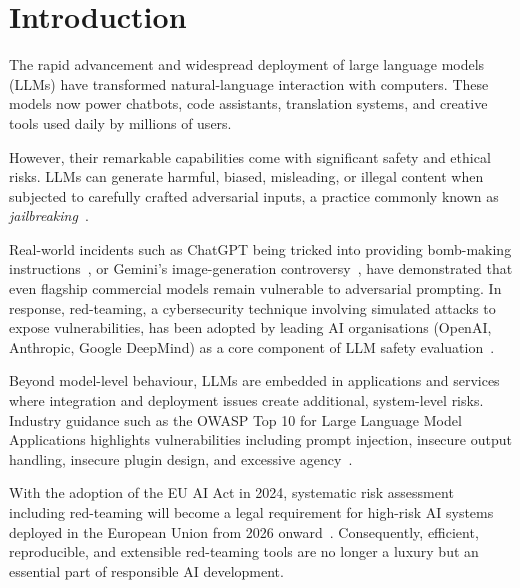 
% 

\chapter{Introduction}\label{ch:introduction}

The rapid advancement and widespread deployment of large language models (LLMs) have transformed natural-language interaction with computers.
These models now power chatbots, code assistants, translation systems, and creative tools used daily by millions of users.

However, their remarkable capabilities come with significant safety and ethical risks.
LLMs can generate harmful, biased, misleading, or illegal content when subjected to carefully crafted adversarial inputs, a practice commonly known as \emph{jailbreaking}~\cite{wei2023jailbroken, zou2023universal}.

Real-world incidents such as ChatGPT being tricked into providing bomb-making instructions~\cite{yaser2023potential}, or Gemini's image-generation controversy~\cite{shaw2025agonistic}, have demonstrated that even flagship commercial models remain vulnerable to adversarial prompting.
In response, red-teaming, a cybersecurity technique involving simulated attacks to expose vulnerabilities, has been adopted by leading AI organisations (OpenAI, Anthropic, Google DeepMind) as a core component of LLM safety evaluation~\cite{openai2023redteaming}.

Beyond model-level behaviour, LLMs are embedded in applications and services where integration and deployment issues create additional, system-level risks.
Industry guidance such as the OWASP Top 10 for Large Language Model Applications highlights vulnerabilities including prompt injection, insecure output handling, insecure plugin design, and excessive agency~\cite{owasp2025llm, owasp2025top}.

With the adoption of the EU AI Act in 2024, systematic risk assessment including red-teaming will become a legal requirement for high-risk AI systems deployed in the European Union from 2026 onward~\cite{eu2024aiact}.
Consequently, efficient, reproducible, and extensible red-teaming tools are no longer a luxury but an essential part of responsible AI development.

